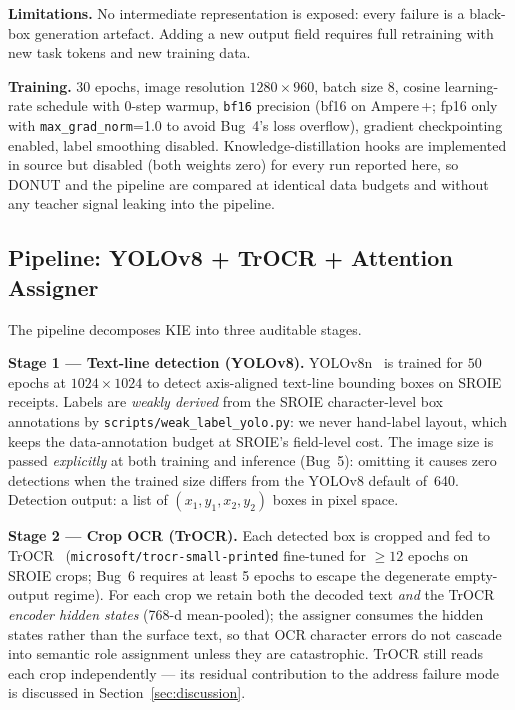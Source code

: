 \documentclass[conference]{IEEEtran}
\begin{document}
\textbf{Limitations.}
No intermediate representation is exposed: every failure is a
black-box generation artefact.  Adding a new output field requires
full retraining with new task tokens and new training data.

\textbf{Training.}
30 epochs, image resolution $1280\times960$, batch size 8, cosine
learning-rate schedule with 0-step warmup, \texttt{bf16} precision
(bf16 on Ampere\,+; fp16 only with \texttt{max\_grad\_norm}=1.0 to
avoid Bug~4's loss overflow), gradient checkpointing enabled, label
smoothing disabled.  Knowledge-distillation hooks are implemented in
source but disabled (both weights zero) for every run reported here,
so DONUT and the pipeline are compared at identical data budgets and
without any teacher signal leaking into the pipeline.

\subsection{Pipeline: YOLOv8 + TrOCR + Attention Assigner}
\label{sec:pipeline_desc}

The pipeline decomposes KIE into three auditable stages.

\textbf{Stage 1 --- Text-line detection (YOLOv8).}
YOLOv8n~\cite{jocher2023yolov8} is trained for $50$ epochs
at $1024\times1024$ to detect axis-aligned
text-line bounding boxes on SROIE receipts.
Labels are \emph{weakly derived} from the SROIE character-level box
annotations by \texttt{scripts/weak\_label\_yolo.py}: we never hand-label
layout, which keeps the data-annotation budget at SROIE's field-level cost.
The image size is passed \emph{explicitly} at both training and
inference (Bug~5): omitting it causes zero detections when the
trained size differs from the YOLOv8 default of~640.
Detection output: a list of $(x_1,y_1,x_2,y_2)$ boxes in pixel space.

\textbf{Stage 2 --- Crop OCR (TrOCR).}
Each detected box is cropped and fed to
TrOCR~\cite{li2023trocr} (\texttt{microsoft/trocr-small-printed}
fine-tuned for $\geq12$ epochs on SROIE crops;
Bug~6 requires at least 5 epochs to escape the degenerate empty-output
regime).  For each crop we retain both the decoded text \emph{and} the
TrOCR \emph{encoder hidden states} (768-d mean-pooled); the assigner
consumes the hidden states rather than the surface text, so that OCR
character errors do not cascade into semantic role assignment unless
they are catastrophic.  TrOCR still reads each crop independently ---
its residual contribution to the address failure mode is discussed in
Section~\ref{sec:discussion}.
\end{document}
